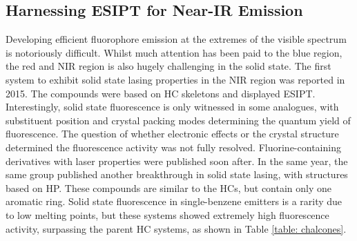 \subsection{Harnessing ESIPT for Near-IR Emission}
Developing efficient fluorophore emission at the extremes of the visible spectrum is notoriously difficult. Whilst much attention has been paid to the blue region, the red and \ac{NIR} region is also hugely challenging in the solid state. The first system to exhibit solid state lasing properties in the \ac{NIR} region was reported in 2015.\cite{Cheng2015} The compounds were based on \ac{HC} skeletons and displayed \ac{ESIPT}. Interestingly, solid state fluorescence is only witnessed in some analogues, with substituent position and crystal packing modes determining the quantum yield of fluorescence. The question of whether electronic effects or the crystal structure determined the fluorescence activity was not fully resolved. Fluorine-containing derivatives with laser properties were published soon after.\cite{Cheng2016} In the same year, the same group published another breakthrough in solid state lasing, with structures based on  \ac{HP}.\cite{Tang2016} These compounds are similar to the \acp{HC}, but contain only one aromatic ring. Solid state fluorescence in single-benzene emitters is a rarity due to low melting points, but these systems showed extremely high fluorescence activity, surpassing the parent \ac{HC} systems, as shown in Table \ref{table: chalcones}.

